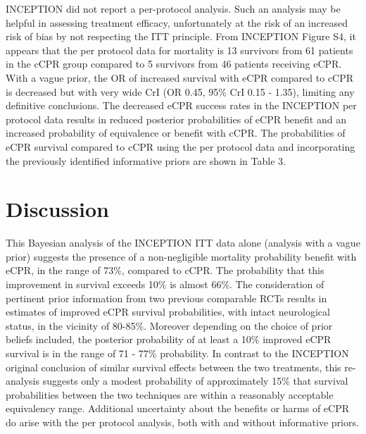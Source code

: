 \documentclass[
  super,
  preprint,
  3p]{elsarticle}
\begin{document}
INCEPTION\citep{CPR2023a} did not report a per-protocol analysis. Such
an analysis may be helpful in assessing treatment efficacy,
unfortunately at the risk of an increased risk of bias by not respecting
the ITT principle. From INCEPTION\citep{CPR2023a} Figure
S4\citep{CPR2023a}, it appears that the per protocol data for mortality
is 13 survivors from 61 patients in the cCPR group compared to 5
survivors from 46 patients receiving eCPR. With a vague prior, the OR of
increased survival with eCPR compared to cCPR is decreased but with very
wide CrI (OR 0.45, 95\% CrI 0.15 - 1.35), limiting any definitive
conclusions. The decreased eCPR success rates in the
INCEPTION\citep{CPR2023a} per protocol data results in reduced posterior
probabilities of eCPR benefit and an increased probability of
equivalence or benefit with cCPR. The probabilities of eCPR survival
compared to cCPR using the per protocol data and incorporating the
previously identified informative priors are shown in Table 3.

\hypertarget{discussion}{%
\section{Discussion}\label{discussion}}

This Bayesian analysis of the INCEPTION\citep{CPR2023a} ITT data alone
(analysis with a vague prior) suggests the presence of a non-negligible
mortality probability benefit with eCPR, in the range of 73\%, compared
to cCPR. The probability that this improvement in survival exceeds 10\%
is almost 66\%. The consideration of pertinent prior information from
two previous comparable RCTs\citep{RN6751, RN6759} results in estimates
of improved eCPR survival probabilities, with intact neurological
status, in the vicinity of 80-85\%. Moreover depending on the choice of
prior beliefs included, the posterior probability of at least a 10\%
improved eCPR survival is in the range of 71 - 77\% probability. In
contrast to the INCEPTION\citep{CPR2023a} original conclusion of similar
survival effects between the two treatments, this re-analysis suggests
only a modest probability of approximately 15\% that survival
probabilities between the two techniques are within a reasonably
acceptable equivalency range. Additional uncertainty about the benefits
or harms of eCPR do arise with the per protocol analysis, both with and
without informative priors.
\end{document}
